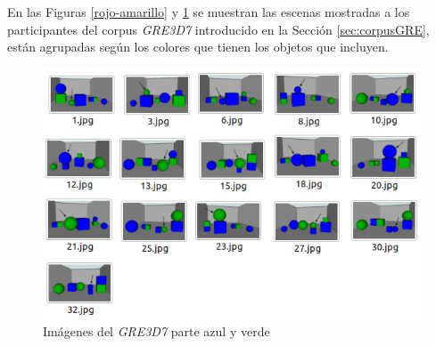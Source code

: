 En las Figuras \ref{rojo-amarillo} y \ref{verde-azul} se muestran las escenas mostradas a los participantes del corpus \textit{GRE3D7} introducido en la Secci\'on \ref{sec:corpusGRE}, est\'an agrupadas seg\'un los colores que tienen los objetos que incluyen.

\begin{figure}[H]
\centering
\includegraphics[width=1\textwidth]{images/imagenesML.png}
\caption{Im\'agenes del \textit{GRE3D7} parte azul y verde}
\label{verde-azul}
\end{figure}

